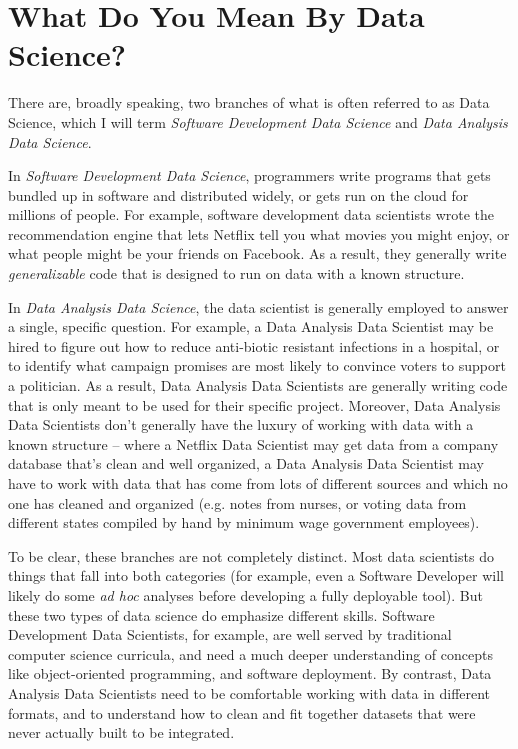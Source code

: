 \documentclass[12pt]{article}
\begin{document}
\section{What Do You Mean By Data Science?}

There are, broadly speaking, two branches of what is often referred to as Data Science, which I will term \emph{Software Development Data Science} and \emph{Data Analysis Data Science}.

In \emph{Software Development Data Science}, programmers write programs that gets bundled up in software and distributed widely, or gets run on the cloud for millions of people. For example, software development data scientists wrote the recommendation engine that lets Netflix tell you what movies you might enjoy, or what people might be your friends on Facebook. As a result, they generally write \emph{generalizable} code that is designed to run on data with a known structure.

In \emph{Data Analysis Data Science}, the data scientist is generally employed to answer a single, specific question. For example, a Data Analysis Data Scientist may be hired to figure out how to reduce anti-biotic resistant infections in a hospital, or to identify what campaign promises are most likely to convince voters to support a politician. As a result, Data Analysis Data Scientists are generally writing code that is only meant to be used for their specific project. Moreover, Data Analysis Data Scientists don't generally have the luxury of working with data with a known structure -- where a Netflix Data Scientist may get data from a company database that's clean and well organized, a Data Analysis Data Scientist may have to work with data that has come from lots of different sources and which no one has cleaned and organized (e.g. notes from nurses, or voting data from different states compiled by hand by minimum wage government employees).

To be clear, these branches are not completely distinct. Most data scientists do things that fall into both categories (for example, even a Software Developer will likely do some \emph{ad hoc} analyses before developing a fully deployable tool). But these two types of data science do emphasize different skills. Software Development Data Scientists, for example, are well served by traditional computer science curricula, and need a much deeper understanding of concepts like object-oriented programming, and software deployment. By contrast, Data Analysis Data Scientists need to be comfortable working with data in different formats, and to understand how to clean and fit together datasets that were never actually built to be integrated.
\end{document}
